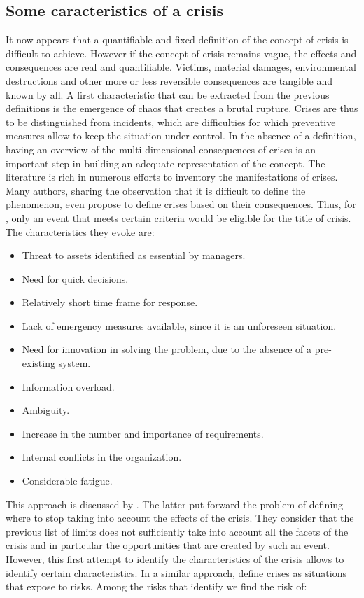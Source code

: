 \subsection{Some caracteristics of a crisis}
It now appears that a quantifiable and fixed definition of the concept of crisis is difficult to achieve.
However if the concept of crisis remains vague, the effects and consequences are real and quantifiable.
Victims, material damages, environmental destructions and other more or less reversible consequences are tangible and known by all.
A first characteristic that can be extracted from the previous definitions is the emergence of chaos that creates a brutal rupture.
Crises are thus to be distinguished from incidents, which are difficulties for which preventive measures allow to keep the situation under control.
In the absence of a definition, having an overview of the multi-dimensional consequences of crises is an important step in building an adequate representation of the concept.
The literature is rich in numerous efforts to inventory the manifestations of crises.
Many authors, sharing the observation that it is difficult to define the phenomenon, even propose to define crises based on their consequences.
Thus, for \textcite{milburnManagementCrisis1972}, only an event that meets certain criteria would be eligible for the title of crisis.
The characteristics they evoke are:

\begin{itemize}
    \item Threat to assets identified as essential by managers.
    \item Need for quick decisions.
    \item Relatively short time frame for response.
    \item Lack of emergency measures available, since it is an unforeseen situation.
    \item Need for innovation in solving the problem, due to the absence of a pre-existing system.
    \item Information overload.
    \item Ambiguity.
    \item Increase in the number and importance of requirements.
    \item Internal conflicts in the organization.
    \item Considerable fatigue.
\end{itemize}

This approach is discussed by \textcite{rosenthalCrisisDecisionMakingNetherlands1986}.
The latter put forward the problem of defining where to stop taking into account the effects of the crisis.
They consider that the previous list of limits does not sufficiently take into account all the facets of the crisis and in particular the opportunities that are created by such an event.
However, this first attempt to identify the characteristics of the crisis allows to identify certain characteristics.
In a similar approach, \textcite{finkCrisisManagementPlanning1986} define crises as situations that expose to risks.
Among the risks that identify we find the risk of:

